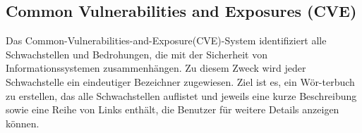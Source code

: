 \subsection{Common Vulnerabilities and Exposures (CVE)}

Das Common-Vulnerabilities-and-Exposure(CVE)-System identifiziert alle Schwachstellen und Bedrohungen, die mit der Sicherheit von Informationssystemen zusammenhängen. Zu diesem Zweck wird jeder Schwachstelle ein eindeutiger Bezeichner zugewiesen. Ziel ist es, ein Wör-terbuch zu erstellen, das alle Schwachstellen auflistet und jeweils eine kurze Beschreibung sowie eine Reihe von Links enthält, die Benutzer für weitere Details anzeigen können\cite{cve18}.\\
















